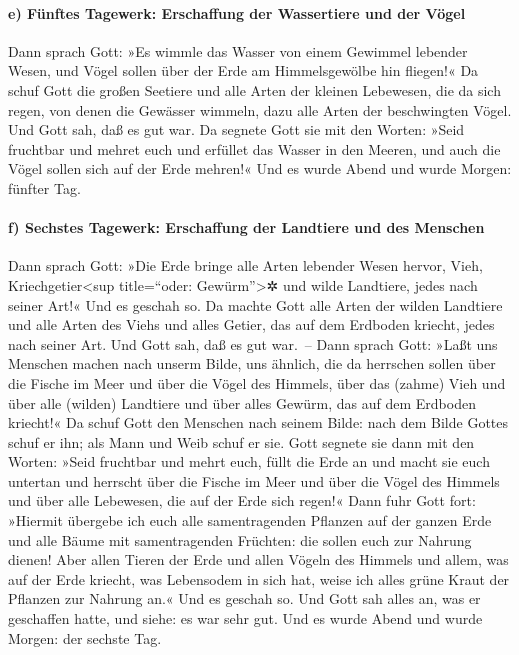 \hypertarget{e-fuxfcnftes-tagewerk-erschaffung-der-wassertiere-und-der-vuxf6gel}{%
\paragraph{e) Fünftes Tagewerk: Erschaffung der Wassertiere und der
Vögel}\label{e-fuxfcnftes-tagewerk-erschaffung-der-wassertiere-und-der-vuxf6gel}}

 Dann sprach Gott: »Es wimmle das Wasser von einem
Gewimmel lebender Wesen, und Vögel sollen über der Erde am
Himmelsgewölbe hin fliegen!«  Da schuf Gott die großen
Seetiere und alle Arten der kleinen Lebewesen, die da sich regen, von
denen die Gewässer wimmeln, dazu alle Arten der beschwingten Vögel. Und
Gott sah, daß es gut war.  Da segnete Gott sie mit den
Worten: »Seid fruchtbar und mehret euch und erfüllet das Wasser in den
Meeren, und auch die Vögel sollen sich auf der Erde mehren!«
 Und es wurde Abend und wurde Morgen: fünfter Tag.

\hypertarget{f-sechstes-tagewerk-erschaffung-der-landtiere-und-des-menschen}{%
\paragraph{f) Sechstes Tagewerk: Erschaffung der Landtiere und des
Menschen}\label{f-sechstes-tagewerk-erschaffung-der-landtiere-und-des-menschen}}

 Dann sprach Gott: »Die Erde bringe alle Arten lebender
Wesen hervor, Vieh, Kriechgetier\textless sup title=``oder:
Gewürm''\textgreater✲ und wilde Landtiere, jedes nach seiner Art!« Und
es geschah so.  Da machte Gott alle Arten der wilden
Landtiere und alle Arten des Viehs und alles Getier, das auf dem
Erdboden kriecht, jedes nach seiner Art. Und Gott sah, daß es gut
war.~--  Dann sprach Gott: »Laßt uns Menschen machen nach
unserm Bilde, uns ähnlich, die da herrschen sollen über die Fische im
Meer und über die Vögel des Himmels, über das (zahme) Vieh und über alle
(wilden) Landtiere und über alles Gewürm, das auf dem Erdboden kriecht!«
 Da schuf Gott den Menschen nach seinem Bilde: nach dem
Bilde Gottes schuf er ihn; als Mann und Weib schuf er sie.
 Gott segnete sie dann mit den Worten: »Seid fruchtbar
und mehrt euch, füllt die Erde an und macht sie euch untertan und
herrscht über die Fische im Meer und über die Vögel des Himmels und über
alle Lebewesen, die auf der Erde sich regen!«  Dann fuhr
Gott fort: »Hiermit übergebe ich euch alle samentragenden Pflanzen auf
der ganzen Erde und alle Bäume mit samentragenden Früchten: die sollen
euch zur Nahrung dienen!  Aber allen Tieren der Erde und
allen Vögeln des Himmels und allem, was auf der Erde kriecht, was
Lebensodem in sich hat, weise ich alles grüne Kraut der Pflanzen zur
Nahrung an.« Und es geschah so.  Und Gott sah alles an,
was er geschaffen hatte, und siehe: es war sehr gut. Und es wurde Abend
und wurde Morgen: der sechste Tag.

